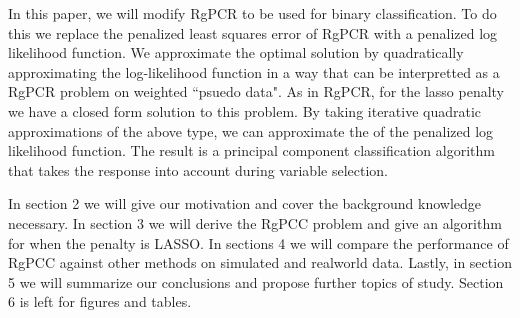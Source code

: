 \documentclass[main.tex]{subfiles}
\begin{document}
In this paper, we will modify RgPCR to be used for binary classification. To do this we replace the penalized least squares error of RgPCR with a penalized log likelihood function. We approximate the optimal solution by quadratically approximating the log-likelihood function in a way that can be interpretted as a RgPCR problem on weighted ``psuedo data". As in RgPCR, for the lasso penalty we have a closed form solution to this problem. By taking iterative quadratic approximations of the above type, we can approximate the of the penalized log likelihood function. The result is a principal component classification algorithm that takes the response into account during variable selection.

In section 2 we will give our motivation and cover the background knowledge necessary. In section 3 we will derive the RgPCC problem and give an algorithm for when the penalty is LASSO. In sections 4 we will compare the performance of RgPCC against other methods on simulated and realworld data. Lastly, in section 5 we will summarize our conclusions and propose further topics of study. Section 6 is left for figures and tables.
\end{document}
